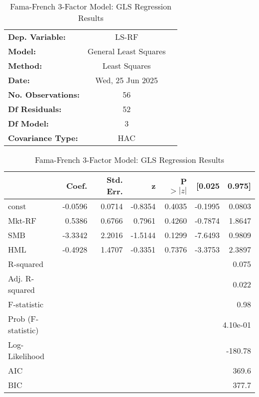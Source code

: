 \begin{table}[htbp]
\centering
\caption{GLS Regression Results}
\begin{tabular}{lcl}
\toprule
\textbf{Dep. Variable:} & LS-RF & \\
\textbf{Model:} & General Least Squares & \\
\textbf{Method:} & Least Squares & \\
\textbf{Date:} & Wed, 25 Jun 2025 & \\
\textbf{No. Observations:} & 56 & \\
\textbf{Df Residuals:} & 52 & \\
\textbf{Df Model:} & 3 & \\
\textbf{Covariance Type:} & HAC & \\
\bottomrule
\end{tabular}
\vspace{0.5em}
\centering
\caption{Fama-French 3-Factor Model: GLS Regression Results}
\label{tab:gls_results}
\begin{tabular}{lrrrrrr}
\toprule
 & Coef. & Std. Err. & z & P$>|z|$ & [0.025 & 0.975] \\
\midrule
const & -0.0596 & 0.0714 & -0.8354 & 0.4035 & -0.1995 & 0.0803 \\
Mkt-RF & 0.5386 & 0.6766 & 0.7961 & 0.4260 & -0.7874 & 1.8647 \\
SMB & -3.3342 & 2.2016 & -1.5144 & 0.1299 & -7.6493 & 0.9809 \\
HML & -0.4928 & 1.4707 & -0.3351 & 0.7376 & -3.3753 & 2.3897 \\
\midrule
R-squared & \multicolumn{6}{r}{0.075} \\
Adj. R-squared & \multicolumn{6}{r}{0.022} \\
F-statistic & \multicolumn{6}{r}{0.98} \\
Prob (F-statistic) & \multicolumn{6}{r}{4.10e-01} \\
Log-Likelihood & \multicolumn{6}{r}{-180.78} \\
AIC & \multicolumn{6}{r}{369.6} \\
BIC & \multicolumn{6}{r}{377.7} \\
\bottomrule
\end{tabular}
\end{table}